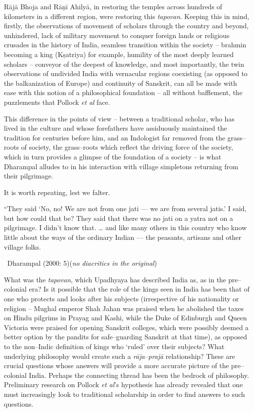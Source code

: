 Rājā Bhoja and Rāṇī Ahilyā, in restoring the temples across hundreds of kilometers in a different region, were restoring this \textit{tapovan}. Keeping this in mind, firstly, the observations of movement of scholars through the country and beyond, unhindered, lack of military movement to conquer foreign lands or religious crusades in the history of India, seamless transition within the society – brahmin becoming a king (Kṣatriya) for example, humility of the most deeply learned scholars – conveyor of the deepest of knowledge, and most importantly, the twin observations of undivided India with vernacular regions coexisting (as opposed to the balkanization of Europe) and continuity of Sanskrit, can all be made with ease with this notion of a philosophical foundation – all without bafflement, the puzzlements that Pollock \textit{et al} face.

This difference in the points of view – between a traditional scholar, who has lived in the culture and whose forefathers have assiduously maintained the tradition for centuries before him, and an Indologist far removed from the grass–roots of society, the grass–roots which reflect the driving force of the society, which in turn provides a glimpse of the foundation of a society – is what Dharampal alludes to in his interaction with village simpletons returning from their pilgrimage.

It is worth repeating, lest we falter.

\begin{myquote}
“They said ‘No, no! We are not from one jati — we are from several jatis.’ I said, but how could that be? They said that there was no jati on a yatra not on a pilgrimage. I didn’t know that. … and like many others in this country who know little about the ways of the ordinary Indian — the peasants, artisans and other village folks. 

~\hfill Dharampal (2000: 5)(\textit{no diacritics in the original})
\end{myquote}

What was the \textit{tapovan}, which Upadhyaya has described India as, as in the pre–colonial era? Is it possible that the role of the kings seen in India has been that of one who protects and looks after his subjects (irrespective of his nationality or religion – Mughal emperor Shah Jahan was praised when he abolished the taxes on Hindu pilgrims in Prayag and Kashi, while the Duke of Edinburgh and Queen Victoria were praised for opening Sanskrit colleges, which were possibly deemed a better option by the pandits for safe–guarding Sanskrit at that time), as opposed to the non–Indic definition of kings who ‘ruled’ over their subjects? What underlying philosophy would create such a \textit{rāja–prajā} relationship? These are crucial questions whose answers will provide a more accurate picture of the pre–colonial India. Perhaps the connecting thread has been the bedrock of philosophy. Preliminary research on Pollock \textit{et al}’s hypothesis has already revealed that one must increasingly look to traditional scholarship in order to find answers to such questions.


